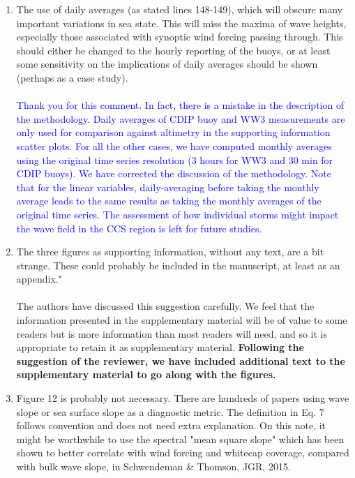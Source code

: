 \documentclass{article}
\begin{document}
\begin{enumerate}
\begin{enumerate}
\item
The use of daily averages (as stated lines 148-149), which will obscure many important variations in sea state. This will miss the maxima of wave heights, especially those associated with synoptic wind forcing passing through. This should either be changed to the hourly reporting of the buoys, or at least some sensitivity on the implications of daily averages should be shown (perhaps as a case study).
\\\\
\textcolor{blue}{Thank you for this comment. In fact, there is a mistake in the description of the methodology. Daily averages of CDIP buoy and WW3 measurements are only used for comparison against altimetry in the supporting information scatter plots. For all the other cases, we have computed monthly averages using the original time series resolution (3 hours for WW3 and 30 min for CDIP buoys). We have corrected the discussion of the methodology. Note that for the linear variables, daily-averaging before taking the monthly average leads to the same results as taking the monthly averages of the original time series. The assessment of how individual storms might impact the wave field in the CCS region is left for future studies.}
\\
\item
The three figures as supporting information, without any text, are a bit strange. These could probably be included in the manuscript, at least as an appendix."
\\\\
{\color{blue} The authors have discussed this suggestion carefully. We feel that the information presented in the supplementary material will be of value to some readers but is more information than most readers will need, and so it is appropriate to retain it as supplementary material.\textbf{ Following the suggestion of the reviewer, we have included additional text to the supplementary material to go along with the figures.}}
\\
\item Figure 12 is probably not necessary. There are hundreds of papers using wave slope or sea surface slope as a diagnostic metric. The definition in Eq. 7 follows convention and does not need extra explanation. On this note, it might be worthwhile to use the spectral "mean square slope" which has been shown to better correlate with wind forcing and whitecap coverage, compared with bulk wave slope, in Schwendeman \& Thomson, JGR, 2015. 

\end{enumerate}
\end{enumerate}
\end{document}

